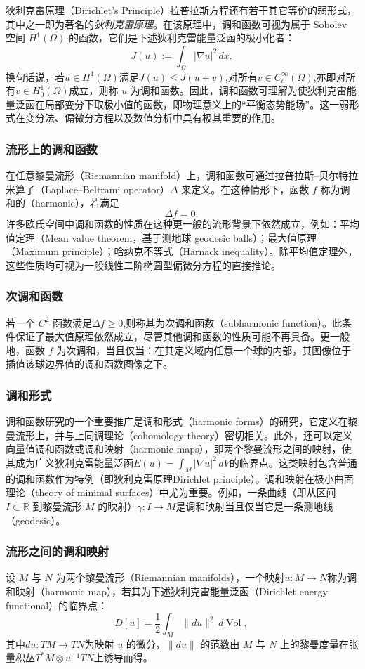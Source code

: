 狄利克雷原理（Dirichlet’s Principle）拉普拉斯方程还有若干其它等价的弱形式，其中之一即为著名的\emph{狄利克雷原理}。在该原理中，调和函数可视为属于 Sobolev 空间 \(H^1(\Omega)\) 的函数，它们是下述狄利克雷能量泛函的极小化者：
\[
J(u) := \int_{\Omega} |\nabla u|^2 \, dx.~
\]
换句话说，若\(u \in H^1(\Omega)\)满足\(J(u) \le J(u + v)\),对所有\(v \in C_c^\infty(\Omega)\),亦即对所有\(v \in H_0^1(\Omega)\)成立，则称 \(u\) 为调和函数。因此，调和函数可理解为使狄利克雷能量泛函在局部变分下取极小值的函数，即物理意义上的“平衡态势能场”。这一弱形式在变分法、偏微分方程以及数值分析中具有极其重要的作用。
\subsubsection{流形上的调和函数}
在任意黎曼流形（Riemannian manifold）上，调和函数可通过拉普拉斯–贝尔特拉米算子（Laplace–Beltrami operator）\(\Delta\) 来定义。在这种情形下，函数 \(f\) 称为调和的（harmonic），若满足
\[
\Delta f = 0.~
\]
许多欧氏空间中调和函数的性质在这种更一般的流形背景下依然成立，例如：平均值定理（Mean value theorem，基于测地球 geodesic balls）；最大值原理（Maximum principle）；哈纳克不等式（Harnack inequality）。除平均值定理外，这些性质均可视为一般线性二阶椭圆型偏微分方程的直接推论。
\subsubsection{次调和函数}
若一个 \(C^2\) 函数满足\(\Delta f \ge 0\),则称其为次调和函数（subharmonic function）。此条件保证了最大值原理依然成立，尽管其他调和函数的性质可能不再具备。更一般地，函数 \(f\) 为次调和，当且仅当：在其定义域内任意一个球的内部，其图像位于插值该球边界值的调和函数图像之下。
\subsubsection{调和形式}
调和函数研究的一个重要推广是调和形式（harmonic forms）的研究，它定义在黎曼流形上，并与上同调理论（cohomology theory）密切相关。此外，还可以定义向量值调和函数或调和映射（harmonic maps），即两个黎曼流形之间的映射，使其成为广义狄利克雷能量泛函\(E(u) = \int_M |\nabla u|^2 \, dV\)的临界点。这类映射包含普通的调和函数作为特例（即狄利克雷原理Dirichlet principle）。调和映射在极小曲面理论（theory of minimal surfaces）中尤为重要。例如，一条曲线（即从区间 \(I \subset \mathbb{R}\) 到黎曼流形 \(M\) 的映射）\(\gamma: I \to M\)是调和映射当且仅当它是一条测地线（geodesic）。
\subsubsection{流形之间的调和映射}
设 \( M \) 与 \( N \) 为两个黎曼流形（Riemannian manifolds），一个映射\(u : M \to N\)称为调和映射（harmonic map），若其为下述狄利克雷能量泛函（Dirichlet energy functional）的临界点：
\[
D[u] = \frac{1}{2} \int_M \| du \|^2 \, d\operatorname{Vol},~
\]
其中$du : TM \to TN$为映射 \(u\) 的微分，\(\| du \|\) 的范数由 \(M\) 与 \(N\) 上的黎曼度量在张量积丛$T^*M \otimes u^{-1}TN$上诱导而得。


